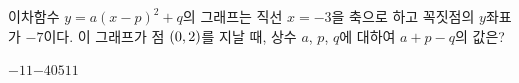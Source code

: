 이차함수 $y=a(x-p)^2+q$의 그래프는 직선 $x=-3$을 축으로 하고 꼭짓점의 $y$좌표가 $-7$이다. 이 그래프가 점 $(0{,}\mkern3mu\mathopen{}2)$를 지날 때, 상수 $a$, $p$, $q$에 대하여 $a+p-q$의 값은?
\begin{choices32}{$-11$}{$-4$}{$0$}{$5$}{$11$}\end{choices32}
